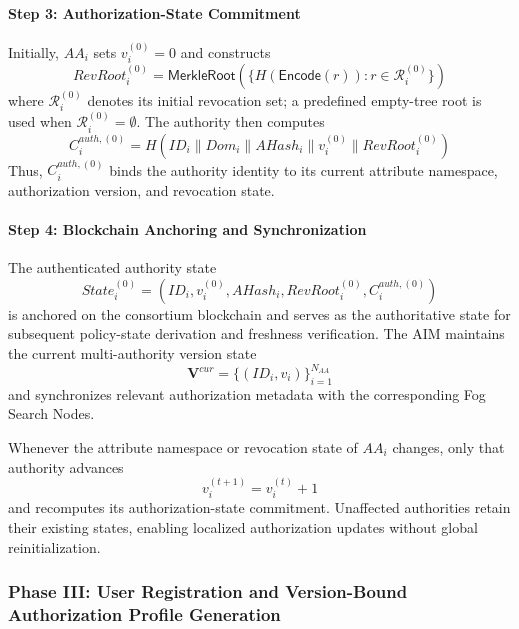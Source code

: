 \documentclass{ieeetj}
\theoremstyle{ieee-style}
\begin{document}
\paragraph*{Step 3: Authorization-State Commitment}

Initially, $AA_i$ sets $v_i^{(0)}=0$ and constructs
\begin{equation}
RevRoot_i^{(0)}
=
\mathsf{MerkleRoot}
\left(
\{H(\mathsf{Encode}(r)):r\in\mathcal{R}_i^{(0)}\}
\right)
\end{equation}
where $\mathcal{R}_i^{(0)}$ denotes its initial revocation set; a
predefined empty-tree root is used when
$\mathcal{R}_i^{(0)}=\emptyset$. The authority then computes
\begin{equation}
C_i^{auth,(0)}
=
H\!\left(
ID_i\parallel Dom_i\parallel AHash_i
\parallel v_i^{(0)}\parallel RevRoot_i^{(0)}
\right)
\end{equation}
Thus, $C_i^{auth,(0)}$ binds the authority identity to its current
attribute namespace, authorization version, and revocation state.

\paragraph*{Step 4: Blockchain Anchoring and Synchronization}

The authenticated authority state
\begin{equation}
State_i^{(0)}
=
\left(
ID_i,v_i^{(0)},AHash_i,
RevRoot_i^{(0)},C_i^{auth,(0)}
\right)
\end{equation}
is anchored on the consortium blockchain and serves as the authoritative
state for subsequent policy-state derivation and freshness verification.
The AIM maintains the current multi-authority version state
\begin{equation}
\mathbf{V}^{cur}
=
\{(ID_i,v_i)\}_{i=1}^{N_{AA}}
\end{equation}
and synchronizes relevant authorization metadata with the corresponding
Fog Search Nodes.

Whenever the attribute namespace or revocation state of $AA_i$ changes,
only that authority advances
\begin{equation}
v_i^{(t+1)}=v_i^{(t)}+1
\end{equation}
and recomputes its authorization-state commitment. Unaffected authorities
retain their existing states, enabling localized authorization updates
without global reinitialization.

\subsubsection*{\textbf{Phase III: User Registration and
Version-Bound Authorization Profile Generation}}
\end{document}
